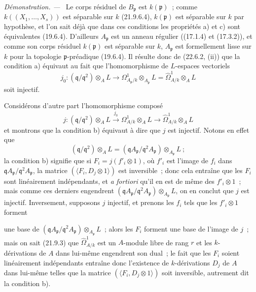 \documentclass[10pt,oneside]{book}
\newcommand{\oldpage}[2][]{%
  \setcounter{footnote}{0}%
  \marginpar{\scriptsize\textbf{#1}~|~#2}\ignorespaces}
\newenvironment{proof}{%
  \par\medskip\noindent\textit{Démonstration. ---\ }}{\par}
\begin{document}
\begin{proof}
Le corps résiduel de $B_{\mathfrak p}$ est $k(\mathfrak p)$~; comme
$k((X_1,\ldots,X_s))$ est séparable sur $k$ (21.9.6.4), $k(\mathfrak p)$ est
séparable sur $k$ par hypothèse, et l'on sait déjà que dans ces conditions les
propriétés a) et c) sont équivalentes (19.6.4). D'ailleurs
$A_{\mathfrak p}$ est un anneau régulier ((17.1.4) et (17.3.2)), et comme son
corps résiduel $k(\mathfrak p)$ est séparable sur $k$, $A_{\mathfrak p}$ est
formellement lisse sur $k$ pour la topologie $\mathfrak p$-préadique
(19.6.4). Il résulte donc de (22.6.2, (ii)) que la condition a) équivaut au
fait que l'homomorphisme de $L$-espaces vectoriels
\begin{equation}
\label{0.22.7.2.1-fr}
  j_0:(\mathfrak q/\mathfrak q^2)\otimes_AL
  \longrightarrow\Omega^1_{A_{\mathfrak p}/k}\otimes_{A_{\mathfrak p}}L
  =\widehat\Omega^1_{A/k}\otimes_AL
  \tag{22.7.2.1}
\end{equation}
soit injectif.

Considérons d'autre part l'homomorphisme composé
\begin{equation}
\label{0.22.7.2.2-fr}
  j:(\mathfrak q/\mathfrak q^2)\otimes_AL
  \xrightarrow{j_0}\Omega^1_{A/k}\otimes_AL
  \longrightarrow\widehat\Omega^1_{A/k}\otimes_AL
  \tag{22.7.2.2}
\end{equation}
et montrons que la condition b) équivaut à dire que $j$ est injectif. Notons en
effet que
\[
  (\mathfrak q/\mathfrak q^2)\otimes_AL
  =(\mathfrak qA_{\mathfrak p}/\mathfrak q^2A_{\mathfrak p})
  \otimes_{A_{\mathfrak p}}L~;
\]
la condition b) signifie que si $F_i=j(f'_i\otimes1)$, où $f'_i$ est l'image
de $f_i$ dans
$\mathfrak qA_{\mathfrak p}/\mathfrak q^2A_{\mathfrak p}$, la matrice
$(\langle F_i,D_j\otimes1\rangle)$ est inversible~; donc cela entraîne que les
$F_i$ sont linéairement indépendants, et \emph{a fortiori} qu'il en est de
même des $f'_i\otimes1$~; mais comme ces derniers engendrent
$(\mathfrak qA_{\mathfrak p}/\mathfrak q^2A_{\mathfrak p})
\otimes_{A_{\mathfrak p}}L$, on en conclut que $j$ est injectif. Inversement,
supposons $j$ injectif, et prenons les $f_i$ tels que les $f'_i\otimes1$
forment

\oldpage[0\textsubscript{IV-1}]{210}

une base de
$(\mathfrak qA_{\mathfrak p}/\mathfrak q^2A_{\mathfrak p})
\otimes_{A_{\mathfrak p}}L$~; alors les $F_i$ forment une base de l'image de
$j$~; mais on sait (21.9.3) que $\widehat\Omega^1_{A/k}$ est un $A$-module
libre de rang $r$ et les $k$-dérivations de $A$ dans lui-même engendrent son
dual~; le fait que les $F_i$ soient linéairement indépendants entraîne donc
l'existence de $k$-dérivations $D_j$ de $A$ dans lui-même telles que la matrice
$(\langle F_i,D_j\otimes1\rangle)$ soit inversible, autrement dit la condition
b).


\end{proof}
\end{document}
